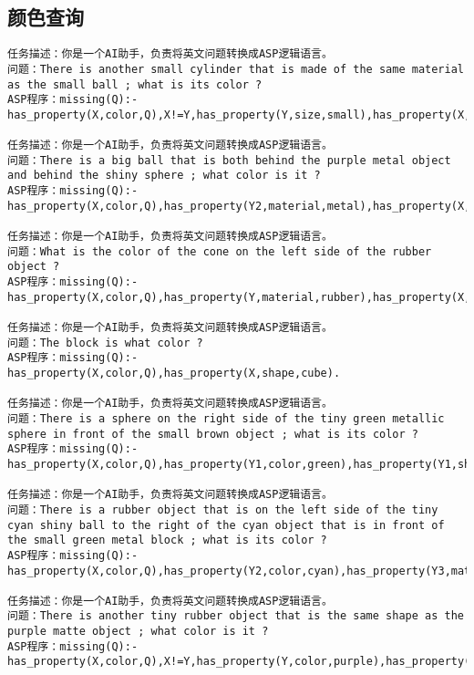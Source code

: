 \subsection{颜色查询}
\begin{lstlisting}
任务描述：你是一个AI助手，负责将英文问题转换成ASP逻辑语言。
问题：There is another small cylinder that is made of the same material as the small ball ; what is its color ? 
ASP程序：missing(Q):-has_property(X,color,Q),X!=Y,has_property(Y,size,small),has_property(X,shape,cylinder),has_property(Y,shape,sphere),has_property(X,size,small),same_material(Y,X).

任务描述：你是一个AI助手，负责将英文问题转换成ASP逻辑语言。
问题：There is a big ball that is both behind the purple metal object and behind the shiny sphere ; what color is it ? 
ASP程序：missing(Q):-has_property(X,color,Q),has_property(Y2,material,metal),has_property(X,size,large),has_property(Y1,material,metal),has_property(X,shape,sphere),has_property(Y1,color,purple),has_property(Y2,shape,sphere),behind(Y1,X),behind(Y2,X),X!=Y1,Y1!=Y2,X!=Y2.

任务描述：你是一个AI助手，负责将英文问题转换成ASP逻辑语言。
问题：What is the color of the cone on the left side of the rubber object ? 
ASP程序：missing(Q):-has_property(X,color,Q),has_property(Y,material,rubber),has_property(X,shape,cone),left(Y,X),X!=Y.

任务描述：你是一个AI助手，负责将英文问题转换成ASP逻辑语言。
问题：The block is what color ? 
ASP程序：missing(Q):-has_property(X,color,Q),has_property(X,shape,cube). 

任务描述：你是一个AI助手，负责将英文问题转换成ASP逻辑语言。
问题：There is a sphere on the right side of the tiny green metallic sphere in front of the small brown object ; what is its color ? 
ASP程序：missing(Q):-has_property(X,color,Q),has_property(Y1,color,green),has_property(Y1,shape,sphere),has_property(X,shape,sphere),has_property(Y2,size,small),has_property(Y1,size,small),has_property(Y2,color,brown),has_property(Y1,material,metal),right(Y1,X),front(Y2,Y1),X!=Y1,Y1!=Y2,X!=Y2. 

任务描述：你是一个AI助手，负责将英文问题转换成ASP逻辑语言。
问题：There is a rubber object that is on the left side of the tiny cyan shiny ball to the right of the cyan object that is in front of the small green metal block ; what is its color ?
ASP程序：missing(Q):-has_property(X,color,Q),has_property(Y2,color,cyan),has_property(Y3,material,metal),has_property(Y3,color,green),has_property(Y1,material,metal),has_property(Y3,size,small),has_property(Y1,color,cyan),has_property(Y1,shape,sphere),has_property(Y3,shape,cube),has_property(X,material,rubber),has_property(Y1,size,small),left(Y1,X),right(Y2,Y1),front(Y3,Y2),X!=Y1,Y1!=Y2,Y2!=Y3,X!=Y2,X!=Y3,Y1!=Y3. 

任务描述：你是一个AI助手，负责将英文问题转换成ASP逻辑语言。
问题：There is another tiny rubber object that is the same shape as the purple matte object ; what color is it ? 
ASP程序：missing(Q):-has_property(X,color,Q),X!=Y,has_property(Y,color,purple),has_property(Y,material,rubber),has_property(X,material,rubber),has_property(X,size,small),same_shape(Y,X). 
\end{lstlisting}
